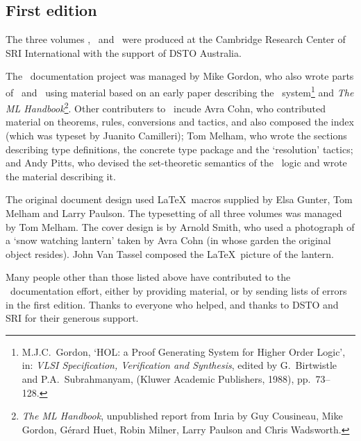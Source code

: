 \subsection*{First edition}

The three volumes \TUTORIAL, \DESCRIPTION\ and \REFERENCE\ were
produced at the Cambridge Research Center of SRI International with
the support of DSTO Australia.

The \HOL\ documentation project was managed by Mike Gordon, who also
wrote parts of \DESCRIPTION\ and \TUTORIAL\ using material based on an
early paper describing the \HOL\ system\footnote{M.J.C.\ Gordon, `HOL:
  a Proof Generating System for Higher Order Logic', in: {\it VLSI
    Specification, Verification and Synthesis\/}, edited by G.\
  Birtwistle and P.A.\ Subrahmanyam, (Kluwer Academic Publishers,
  1988), pp.\ 73--128.} and {\sl The ML Handbook\/}\footnote{{\sl The
    ML Handbook}, unpublished report from Inria by Guy Cousineau, Mike
  Gordon, G\'erard Huet, Robin Milner, Larry Paulson and Chris
  Wadsworth.}.  Other contributers to \DESCRIPTION\ incude Avra Cohn,
who contributed material on theorems, rules, conversions and tactics,
and also composed the index (which was typeset by Juanito Camilleri);
Tom Melham, who wrote the sections describing type definitions, the
concrete type package and the `resolution' tactics; and Andy Pitts,
who devised the set-theoretic semantics of the \HOL\ logic and wrote
the material describing it.

The original document design used \LaTeX\ macros supplied by Elsa
Gunter, Tom Melham and Larry Paulson.  The typesetting of all three
volumes was managed by Tom Melham.  The cover design is by Arnold
Smith, who used a photograph of a `snow watching lantern' taken by
Avra Cohn (in whose garden the original object resides).  John Van
Tassel composed the \LaTeX\ picture of the lantern.

Many people other than those listed above have contributed to the
\HOL\ documentation effort, either by providing material, or by
sending lists of errors in the first edition.  Thanks to everyone who
helped, and thanks to DSTO and SRI for their generous support.






